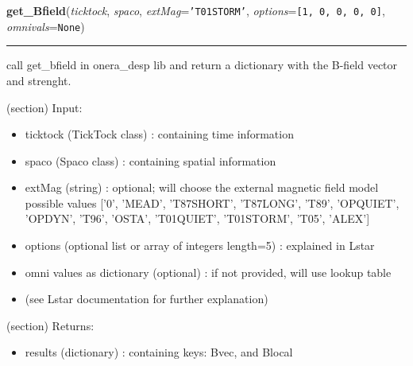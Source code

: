 \hspace{.8\funcindent}\begin{boxedminipage}{\funcwidth}

    \raggedright \textbf{get\_Bfield}(\textit{ticktock}, \textit{spaco}, \textit{extMag}={\tt \texttt{'}\texttt{T01STORM}\texttt{'}}, \textit{options}={\tt \texttt{[}1\texttt{, }0\texttt{, }0\texttt{, }0\texttt{, }0\texttt{]}}, \textit{omnivals}={\tt None})

    \vspace{-1.5ex}

    \rule{\textwidth}{0.5\fboxrule}
\setlength{\parskip}{2ex}
    call get\_bfield in onera\_desp lib and return a dictionary with the 
    B-field vector and strenght.

    (section) Input:

      \begin{itemize}
      \setlength{\parskip}{0.6ex}
        \item ticktock (TickTock class) : containing time information

        \item spaco (Spaco class) : containing spatial information

        \item extMag (string) : optional; will choose the external magnetic 
          field model possible values ['0', 'MEAD', 'T87SHORT', 'T87LONG', 
          'T89', 'OPQUIET', 'OPDYN', 'T96', 'OSTA', 'T01QUIET', 'T01STORM',
          'T05', 'ALEX']

        \item options (optional list or array of integers length=5) : explained
          in Lstar

        \item omni values as dictionary (optional) : if not provided, will use 
          lookup table

        \item (see Lstar documentation for further explanation)

      \end{itemize}

    (section) Returns:

      \begin{itemize}
      \setlength{\parskip}{0.6ex}
        \item results (dictionary) : containing keys: Bvec, and Blocal

      \end{itemize}


\end{boxedminipage}
